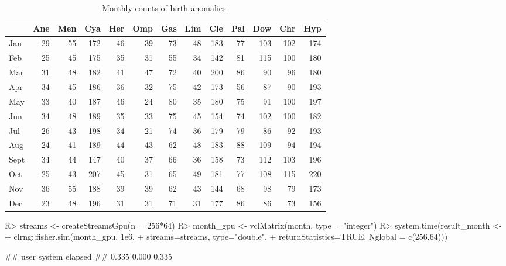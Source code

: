 \documentclass[article,nojss]{jss}\usepackage[]{graphicx}\usepackage[]{color}
\begin{document}
 
\begin{table}

\caption{\label{tab:monthdata}Monthly counts of birth anomalies.\label{tab:month}}
\centering
\begin{tabular}[t]{lrrrrrrrrrrrr}
\toprule
  & Ane & Men & Cya & Her & Omp & Gas & Lim & Cle & Pal & Dow & Chr & Hyp\\
\midrule
Jan & 29 & 55 & 172 & 46 & 39 & 73 & 48 & 183 & 77 & 103 & 102 & 174\\
Feb & 25 & 45 & 175 & 35 & 31 & 55 & 34 & 142 & 81 & 115 & 100 & 180\\
Mar & 31 & 48 & 182 & 41 & 47 & 72 & 40 & 200 & 86 & 90 & 96 & 180\\
Apr & 34 & 45 & 186 & 36 & 32 & 75 & 42 & 173 & 56 & 87 & 90 & 193\\
May & 33 & 40 & 187 & 46 & 24 & 80 & 35 & 180 & 75 & 91 & 100 & 197\\
Jun & 34 & 48 & 189 & 35 & 33 & 75 & 45 & 154 & 74 & 102 & 100 & 182\\
Jul & 26 & 43 & 198 & 34 & 21 & 74 & 36 & 179 & 79 & 86 & 92 & 193\\
Aug & 24 & 41 & 189 & 44 & 43 & 62 & 48 & 183 & 88 & 109 & 94 & 194\\
Sept & 34 & 44 & 147 & 40 & 37 & 66 & 36 & 158 & 73 & 112 & 103 & 196\\
Oct & 25 & 43 & 207 & 45 & 31 & 65 & 49 & 181 & 77 & 108 & 115 & 220\\
Nov & 36 & 55 & 188 & 39 & 39 & 62 & 43 & 144 & 68 & 98 & 79 & 173\\
Dec & 23 & 48 & 196 & 31 & 31 & 71 & 31 & 177 & 86 & 86 & 73 & 156\\
\bottomrule
\end{tabular}
\end{table}





\begin{CodeChunk}
\begin{CodeInput}
R> streams <- createStreamsGpu(n = 256*64)
R> month_gpu <- vclMatrix(month, type = "integer")
R> system.time(result_month <- 
+  clrng::fisher.sim(month_gpu, 1e6, 
+     streams=streams, type="double", 
+     returnStatistics=TRUE,  Nglobal = c(256,64)))
\end{CodeInput}
\begin{CodeOutput}
##    user  system elapsed 
##   0.335   0.000   0.335
\end{CodeOutput} 
\end{CodeChunk} 
\end{document}
